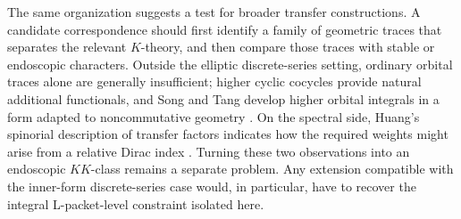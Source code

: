 \documentclass[11pt]{amsart}
\theoremstyle{definition}
\theoremstyle{remark}
\begin{document}
The same organization suggests a test for broader transfer constructions.  A candidate correspondence should first identify a family of geometric traces that separates the relevant $K$-theory, and then compare those traces with stable or endoscopic characters.  Outside the elliptic discrete-series setting, ordinary orbital traces alone are generally insufficient; higher cyclic cocycles provide natural additional functionals, and Song and Tang develop higher orbital integrals in a form adapted to noncommutative geometry \cite{SongTang2025}.  On the spectral side, Huang's spinorial description of transfer factors indicates how the required weights might arise from a relative Dirac index \cite{Huang2021}.  Turning these two observations into an endoscopic $KK$-class remains a separate problem.  Any extension compatible with the inner-form discrete-series case would, in particular, have to recover the integral L-packet-level constraint isolated here.
\end{document}
